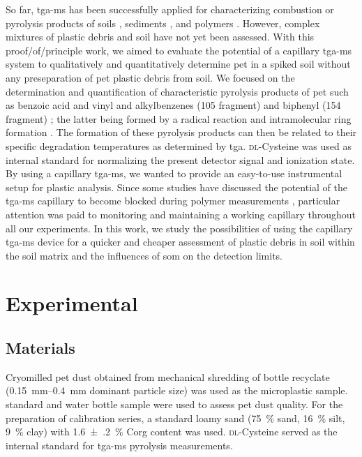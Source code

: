 So far, \ac{tga-ms} has been successfully applied for characterizing combustion or pyrolysis products of soils \citep{PallasserSoil2013,EdmondsonBlack2015,TamimiFate2017}, sediments \citep{FindorakovaAssessment2017}, and polymers \citep{PagaczThermal2015,SchindlerNovel2013}. However, complex mixtures of plastic debris and soil have not yet been assessed.
With this proof\-/of\-/principle work, we aimed to evaluate the potential of a capillary \ac{tga-ms} system to qualitatively and quantitatively determine \ac{pet} in a spiked soil without any preseparation of \ac{pet} plastic debris from soil.
We focused on the determination and quantification of characteristic pyrolysis products of \ac{pet} such as benzoic acid and vinyl and alkylbenzenes (\SI{105}{\mz} fragment) and biphenyl (\SI{154}{\mz} fragment) \citep{DumichenFast2017,DimitrovAnalysis2013,DuemichenAssessment2014}; the latter being formed by a radical reaction and intramolecular ring formation \citep{RichterFormation2000,KawaiCharacterization2008}.
The formation of these pyrolysis products can then be related to their specific degradation temperatures as determined by \ac{tga}. \textsc{dl}-Cysteine was used as internal standard for normalizing the present detector signal and ionization state.
By using a capillary \ac{tga-ms}, we wanted to provide an easy-to-use instrumental setup for plastic analysis. Since some studies have discussed the potential of the \ac{tga-ms} capillary to become blocked during polymer measurements \citep{SchindlerNovel2013,DuemichenAssessment2014}, particular attention was paid to monitoring and maintaining a working capillary throughout all our experiments.
In this work, we study the possibilities of using the capillary \ac{tga-ms} device for a quicker and cheaper assessment of plastic debris in soil within the soil matrix and the influences of \ac{som} on the detection limits.

\section{Experimental}

\subsection{Materials}

Cryomilled \ac{pet} dust obtained from mechanical shredding of bottle recyclate (\SIrange{0.15}{0.4}{\milli\meter} dominant particle size) was used as the microplastic sample.  standard and  water bottle sample were used to assess \ac{pet} dust quality.
For the preparation of calibration series, a standard loamy sand (\SI{75}{\percent} sand, \SI{16}{\percent} silt, \SI{9}{\percent} clay) with \SI{1.6(2)}{\percent} \ac{Corg} content was used. \textsc{dl}-Cysteine served as the internal standard for \ac{tga-ms} pyrolysis measurements.

